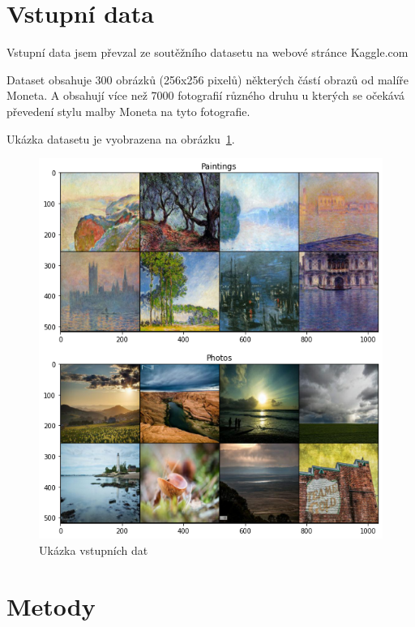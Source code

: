 \documentclass[czech]{mvi-report}
\begin{document}
\section{Vstupní data}

Vstupní data jsem převzal ze soutěžního datasetu na webové stránce Kaggle.com

Dataset obsahuje 300 obrázků (256x256 pixelů) některých částí obrazů od malíře Moneta.
A obsahují více než 7000 fotografií různého druhu u kterých se očekává převedení stylu malby Moneta na tyto fotografie.

Ukázka datasetu je vyobrazena na obrázku~\ref{fig:input-data}.

\begin{figure}[h]
  \centering\leavevmode
  \includegraphics[width=1\linewidth]{img/paintings_photos}\vskip-0.5cm
  \caption{Ukázka vstupních dat}
  \label{fig:input-data}
\end{figure}

\section{Metody}
\end{document}
